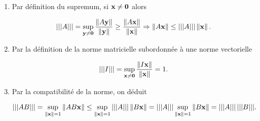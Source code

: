\begin{enumerate}[label=\alph*)]
  \item Par définition du supremum, si $\BoldX \neq \BoldZero$ alors
  
  \begin{equation*}
    \triple{A} = \sup_{\BoldY \neq \BoldZero} \dfrac{\norm{A \BoldY}}{\norm{\BoldY}}
    \geq \dfrac{\norm{A \BoldX}}{\norm{\BoldX}}
    \Rightarrow 
    \norm{A \BoldX} \leq \triple{A} \norm{\BoldX}.
  \end{equation*}
  
  \item Par la définition de la norme matricielle subordonnée à une norme vectorielle
  
  \begin{equation*}
    \triple{I} = \sup_{\BoldX \neq \BoldZero} \dfrac{\norm{I \BoldX}}{\norm{\BoldX}} = 1.
  \end{equation*}
  
  \item Par la compatibilité de la norme, on déduit
  
  \begin{equation*}
    \triple{A B}
    = \sup_{\norm{\BoldX} = 1} \norm{A B \BoldX}
    \leq \sup_{\norm{\BoldX} = 1} \triple{A} \norm{B \BoldX}
    = \triple{A} \sup_{\norm{\BoldX} = 1} \norm{B \BoldX}
    = \triple{A} \triple{B}.
  \end{equation*}
  
\end{enumerate}